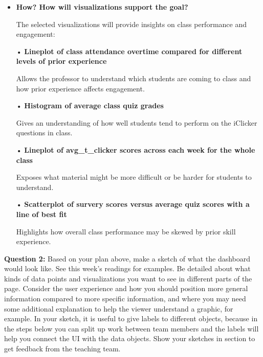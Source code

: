 \documentclass[
]{article}
\begin{document}
\begin{itemize}
  The combined dataset will contain one record per student per class
  session (sometimes multiple per lecture). There will likely be
  visualizations where we aggregate data by lecture. The experience data
  will be joined onto the quiz data. For the teacher dashboard, some of
  the key variables with include skill\_survery\_score for comparing the
  impact that prior experience has on a student's performance,
  quiz\_score to compare performance across all students, and
  avg\_t\_clicker to understand the students' comfortability each
  lecture.
\item
  \textbf{How? How will visualizations support the goal?}

  The selected visualizations will provide insights on class performance
  and engagement:

  • \textbf{Lineplot of class attendance overtime compared for different
  levels of prior experience}

  Allows the professor to understand which students are coming to class
  and how prior experience affects engagement.

  • \textbf{Histogram of average class quiz grades}

  Gives an understanding of how well students tend to perform on the
  iClicker questions in class.

  • \textbf{Lineplot of avg\_t\_clicker scores across each week for the
  whole class}

  Exposes what material might be more difficult or be harder for
  students to understand.

  • \textbf{Scatterplot of survery scores versus average quiz scores
  with a line of best fit}

  Highlights how overall class performance may be skewed by prior skill
  experience.
\end{itemize}

\textbf{Question 2:} Based on your plan above, make a sketch of what the
dashboard would look like. See this week's readings for examples. Be
detailed about what kinds of data points and visualizations you want to
see in different parts of the page. Consider the user experience and how
you should position more general information compared to more specific
information, and where you may need some additional explanation to help
the viewer understand a graphic, for example. In your sketch, it is
useful to give labels to different objects, because in the steps below
you can split up work between team members and the labels will help you
connect the UI with the data objects. Show your sketches in section to
get feedback from the teaching team.
\end{document}
